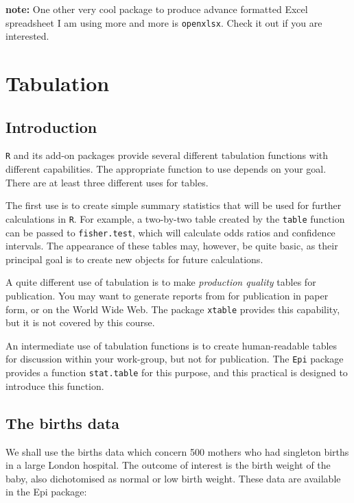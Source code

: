 \documentclass[
]{book}
\begin{document}
\textbf{note:} One other very cool package to produce advance formatted Excel spreadsheet I am using more and more is \texttt{openxlsx}. Check it out if you are interested.

\chapter{Tabulation}\label{tabulation}

\section{Introduction}\label{introduction-2}

\texttt{R} and its add-on packages provide several different
tabulation functions with different capabilities. The appropriate function
to use depends on your goal. There are at least three different uses for
tables.

The first use is to create simple summary statistics that will be used
for further calculations in \texttt{R}. For example,
a two-by-two table created by the \texttt{table} function can be passed
to \texttt{fisher.test}, which will calculate odds ratios and confidence
intervals. The appearance of these tables may, however, be quite basic,
as their principal goal is to create new objects for future calculations.

A quite different use of tabulation is to make \emph{production quality}
tables for publication. You may want to generate reports from for
publication in paper form, or on the World Wide Web. The package
\texttt{xtable} provides this capability, but it is not covered by this course.

An intermediate use of tabulation functions is to create human-readable
tables for discussion within your work-group, but not for publication. The
\texttt{Epi} package provides a function \texttt{stat.table} for this purpose,
and this practical is designed to introduce this function.

\section{The births data}\label{the-births-data-1}

We shall use the births data which concern 500 mothers who had
singleton births in a large London hospital. The outcome of interest
is the birth weight of the baby, also dichotomised as normal or low
birth weight. These data are available in the Epi package:
\end{document}
